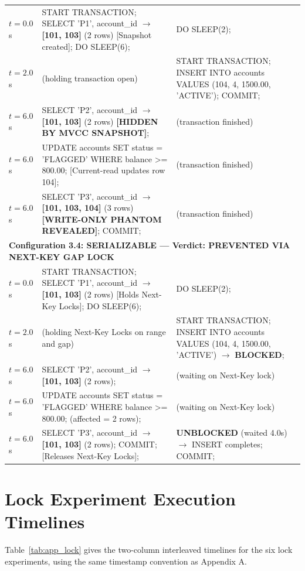 \documentclass[sigconf, pbalance, nonacm]{acmart}
\begin{document}
\begin{table}[p]
\begin{tabularx}{\textwidth}{p{1.8cm} X X}
$t = 0.0$s & START TRANSACTION; SELECT 'P1', account\_id $\rightarrow$ \textbf{[101, 103]} (2 rows) [Snapshot created]; DO SLEEP(6); & DO SLEEP(2); \\
$t = 2.0$s & (holding transaction open) & START TRANSACTION; INSERT INTO accounts VALUES (104, 4, 1500.00, 'ACTIVE'); COMMIT; \\
$t = 6.0$s & SELECT 'P2', account\_id $\rightarrow$ \textbf{[101, 103]} (2 rows) \textbf{[HIDDEN BY MVCC SNAPSHOT]}; & (transaction finished) \\
$t = 6.0$s & UPDATE accounts SET status = 'FLAGGED' WHERE balance >= 800.00; [Current-read updates row 104]; & (transaction finished) \\
$t = 6.0$s & SELECT 'P3', account\_id $\rightarrow$ \textbf{[101, 103, 104]} (3 rows) \textbf{[WRITE-ONLY PHANTOM REVEALED]}; COMMIT; & (transaction finished) \\
\midrule
\multicolumn{3}{l}{\textbf{Configuration 3.4: SERIALIZABLE --- Verdict: PREVENTED VIA NEXT-KEY GAP LOCK}} \\
$t = 0.0$s & START TRANSACTION; SELECT 'P1', account\_id $\rightarrow$ \textbf{[101, 103]} (2 rows) [Holds Next-Key Locks]; DO SLEEP(6); & DO SLEEP(2); \\
$t = 2.0$s & (holding Next-Key Locks on range and gap) & START TRANSACTION; INSERT INTO accounts VALUES (104, 4, 1500.00, 'ACTIVE') $\rightarrow$ \textbf{BLOCKED}; \\
$t = 6.0$s & SELECT 'P2', account\_id $\rightarrow$ \textbf{[101, 103]} (2 rows); & (waiting on Next-Key lock) \\
$t = 6.0$s & UPDATE accounts SET status = 'FLAGGED' WHERE balance >= 800.00; (affected = 2 rows); & (waiting on Next-Key lock) \\
$t = 6.0$s & SELECT 'P3', account\_id $\rightarrow$ \textbf{[101, 103]} (2 rows); COMMIT; [Releases Next-Key Locks]; & \textbf{UNBLOCKED} (waited 4.0s) $\rightarrow$ INSERT completes; COMMIT; \\
\bottomrule
\end{tabularx}
\end{table}

\section{Lock Experiment Execution Timelines}
Table~\ref{tab:app_lock} gives the two-column interleaved timelines for the six lock experiments, using the same timestamp convention as Appendix A.
\end{document}
